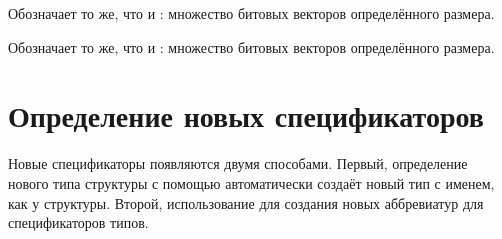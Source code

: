 \begin{flushdesc}

\item[\cd{(bit-vector \emph{размер})}]
Обозначает то же, что и : множество битовых
векторов определённого размера.

\item[\cd{(simple-bit-vector \emph{размер})}]
Обозначает то же, что и : множество битовых
векторов определённого размера.
\end{flushdesc}

\section{Определение новых спецификаторов}

Новые спецификаторы появляются двумя способами.
Первый, определение нового типа структуры с помощью  автоматически
создаёт новый тип с именем, как у структуры.
Второй, использование  для создания новых аббревиатур для
спецификаторов типов.

